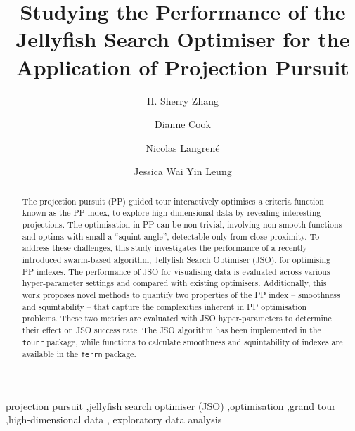 \documentclass[
  number,
  preprint,
  3p]{elsarticle}
\begin{document}
\begin{frontmatter}
\title{Studying the Performance of the Jellyfish Search Optimiser for
the Application of Projection Pursuit}
\author[1]{H. Sherry Zhang%
%
}
\author[2]{Dianne Cook%
%
}
\author[3]{Nicolas Langrené%
%
}
\author[2]{Jessica Wai Yin Leung%
%
}






        
\begin{abstract}
The projection pursuit (PP) guided tour interactively optimises a
criteria function known as the PP index, to explore high-dimensional
data by revealing interesting projections. The optimisation in PP can be
non-trivial, involving non-smooth functions and optima with small a
``squint angle'', detectable only from close proximity. To address these
challenges, this study investigates the performance of a recently
introduced swarm-based algorithm, Jellyfish Search Optimiser (JSO), for
optimising PP indexes. The performance of JSO for visualising data is
evaluated across various hyper-parameter settings and compared with
existing optimisers. Additionally, this work proposes novel methods to
quantify two properties of the PP index -- smoothness and squintability
-- that capture the complexities inherent in PP optimisation problems.
These two metrics are evaluated with JSO hyper-parameters to determine
their effect on JSO success rate. The JSO algorithm has been implemented
in the \texttt{tourr} package, while functions to calculate smoothness
and squintability of indexes are available in the \texttt{ferrn}
package.
\end{abstract}





\begin{keyword}
    projection pursuit \sep jellyfish search optimiser
(JSO) \sep optimisation \sep grand tour \sep high-dimensional data \sep 
    exploratory data analysis
\end{keyword}
\end{frontmatter}
    
\end{document}
